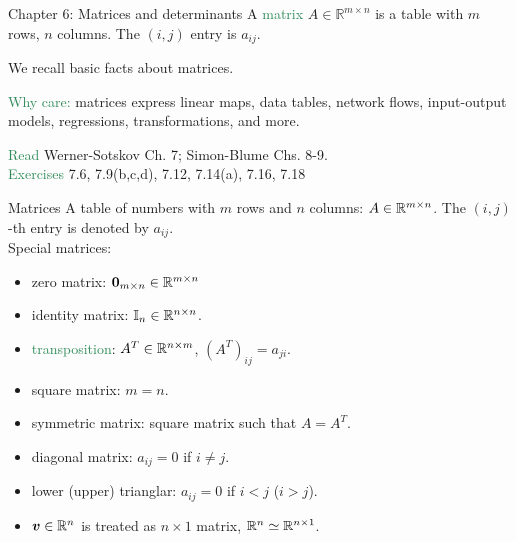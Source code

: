 \documentclass[11pt,aspectratio=169]{beamer}
\begin{document}

\begin{frame}{Chapter 6: Matrices and determinants}
A \textcolor{SeaGreen}{matrix} $A\in\mathbb{R}^{m\times n}$ is a table with $m$ rows, $n$ columns. The $(i,j)$ entry is $a_{ij}$.
\bigskip

We recall basic facts about matrices.
\bigskip

\textcolor{SeaGreen}{Why care:} matrices express linear maps, data tables, network flows, input-output models, regressions, transformations, and more.
\bigskip

\textcolor{SeaGreen}{Read} Werner-Sotskov Ch. 7; Simon-Blume Chs. 8-9. \\[4mm]
\textcolor{SeaGreen}{Exercises} 7.6, 7.9(b,c,d), 7.12, 7.14(a), 7.16, 7.18
\end{frame}



\begin{frame}{Matrices}
	A table of numbers with $m$ rows and $n$ columns: $A\in \mathbb R^{m\times n}$. The $(i,j)$-th entry is denoted by $a_{ij}$.\\[.3cm]
	Special matrices: 
\begin{itemize}
	\item zero matrix: $\boldsymbol 0_{m\times n}\in \mathbb R^{m\times n}$\\[.2cm]
	\item identity matrix: $\mathbb I_n\in \mathbb R^{n\times n}$.\\[.2cm]
		\item \textcolor{SeaGreen}{transposition}: $A^T\in \mathbb R^{n\times m}$, $(A^T)_{ij}=a_{ji}$.\\[.2cm]
		\item square matrix: $m=n$.\\[.2cm]
		\item symmetric matrix: square matrix such that $A=A^T$.\\[.2cm]
		\item diagonal matrix: $a_{ij}=0$ if $i\neq j$.\\[.2cm]
		\item lower (upper) trianglar: $a_{ij}=0$ if $i<j$ ($i>j$).\\[.2cm]
		\item $\boldsymbol v\in \mathbb R^n$ is treated as $n\times 1$ matrix, $\mathbb R^n\simeq \mathbb R^{n\times 1}$. 
\end{itemize}	
\end{frame}
\end{document}
